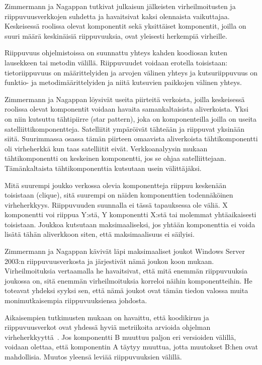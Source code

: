 \documentclass[finnish]{../tktltiki2}
\theoremstyle{definition}
\theoremstyle{remark}
\begin{document}
    Zimmermann ja Nagappan tutkivat julkaisun jälkeisten virheilmoitusten ja riippuvuusverkkojen suhdetta ja havaitsivat 
kaksi olennaista vaikuttajaa. Keskeisessä roolissa olevat komponentit sekä yksittäiset komponentit, joilla on suuri 
määrä keskinäisiä riippuvuuksia, ovat yleisesti herkempiä virheille.

    Riippuvuus ohjelmistoissa on suunnattu yhteys kahden koodiosan kuten lausekkeen tai metodin välillä. Riippuvuudet 
voidaan erotella toisistaan: tietoriippuvuus on määrittelyiden ja arvojen välinen yhteys ja kutsuriippuvuus on 
funktio- ja metodimäärittelyiden ja niitä kutsuvien paikkojen välinen yhteys.

    Zimmermann ja Nagappan löysivät useita piirteitä verkoista, joilla keskeisessä roolissa olevat komponentit voidaan 
havaita samankaltaisista aliverkoista. Yksi on niin kutsuttu tähtipiirre (star pattern), joka on komponenteilla joilla 
on useita satelliittikomponentteja. Satelliitit ympäröivät tähteään ja riippuvat yksinään siitä. Suurimmassa osassa 
tämän piirteen omaavista aliverkoista tähtikomponentti oli virheherkkä kun taas satelliitit eivät. Verkkoanalyysin 
mukaan tähtikomponentti on keskeinen komponentti, jos se ohjaa satelliittejaan. Tämänkaltaista tähtikomponenttia 
kutsutaan usein välittäjäksi.

    Mitä suurempi joukko verkossa olevia komponentteja riippuu keskenään toisistaan (clique), sitä suurempi on näiden 
komponenttien todennäköinen virheherkkyys. Riippuvuuden suunnalla ei tässä tapauksessa ole väliä. X komponentti voi 
riippua Y:stä, Y komponentti X:stä tai molemmat yhtäaikaisesti toisistaan. Joukkoa kutsutaan maksimaaliseksi, jos yhtään 
komponenttia ei voida lisätä tähän aliverkkoon siten, että maksimaalisuus ei säilyisi.

    Zimmermann ja Nagappan kävivät läpi maksimaaliset joukot Windows Server 2003:n riippuvuusverkosta ja järjestivät 
nämä joukon koon mukaan. Virheilmoituksia vertaamalla he havaitsivat, että mitä enemmän riippuvuuksia joukossa on, sitä 
enemmän virheilmoituksia korreloi näihin komponentteihin. He toteavat yhdeksi syyksi sen, että nämä joukot ovat tämän 
tiedon valossa muita monimutkaisempia riippuvuuksiensa johdosta.

    Aikaisempien tutkimusten mukaan on havaittu, että koodikirnu ja riippuvuusverkot ovat yhdessä hyviä metriikoita 
arvioida ohjelman virheherkkyyttä~\cite{NB07}. Jos komponentti B muuttuu paljon eri versioiden välillä, voidaan olettaa, 
että komponentin A täytyy muuttua, jotta muutokset B:hen ovat mahdollisia. Muutos yleensä leviää riippuvuuksien välillä.
\end{document}
